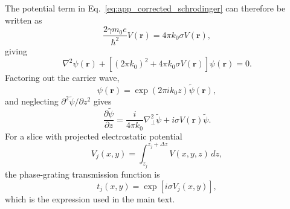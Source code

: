 \documentclass[12pt]{article}
\begin{document}
The potential term in Eq.~\eqref{eq:app_corrected_schrodinger} can therefore be
written as
\begin{equation}
\frac{2\gamma m_0e}{\hbar^2}V(\mathbf r)
=
4\pi k_0\sigma V(\mathbf r),
\label{eq:app_potential_term_sigma}
\end{equation}
giving
\begin{equation}
\nabla^2\psi(\mathbf r)
+
\left[
(2\pi k_0)^2
+
4\pi k_0\sigma V(\mathbf r)
\right]\psi(\mathbf r)
=0.
\label{eq:app_corrected_schrodinger_sigma}
\end{equation}
Factoring out the carrier wave,
\begin{equation}
\psi(\mathbf r)
=
\exp(2\pi i k_0z)\tilde\psi(\mathbf r),
\label{eq:app_carrier_wave}
\end{equation}
and neglecting $\partial^2\tilde\psi/\partial z^2$ gives
\begin{equation}
\frac{\partial\tilde\psi}{\partial z}
=
\frac{i}{4\pi k_0}\nabla_\perp^2\tilde\psi
+
i\sigma V(\mathbf r)\tilde\psi.
\label{eq:app_paraxial_sigma}
\end{equation}
For a slice with projected electrostatic potential
\begin{equation}
V_j(x,y)
=
\int_{z_j}^{z_j+\Delta z}V(x,y,z)\,dz,
\label{eq:app_projected_potential}
\end{equation}
the phase-grating transmission function is
\begin{equation}
t_j(x,y)
=
\exp\left[i\sigma V_j(x,y)\right],
\label{eq:app_transmission_function}
\end{equation}
which is the expression used in the main text.



\end{document}
